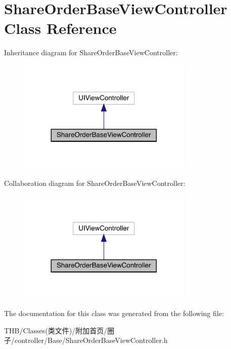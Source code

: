\hypertarget{interface_share_order_base_view_controller}{}\section{Share\+Order\+Base\+View\+Controller Class Reference}
\label{interface_share_order_base_view_controller}


Inheritance diagram for Share\+Order\+Base\+View\+Controller\+:\nopagebreak
\begin{figure}[H]
\begin{center}
\leavevmode
\includegraphics[width=236pt]{interface_share_order_base_view_controller__inherit__graph}
\end{center}
\end{figure}


Collaboration diagram for Share\+Order\+Base\+View\+Controller\+:\nopagebreak
\begin{figure}[H]
\begin{center}
\leavevmode
\includegraphics[width=236pt]{interface_share_order_base_view_controller__coll__graph}
\end{center}
\end{figure}


The documentation for this class was generated from the following file\+:\begin{DoxyCompactItemize}
\item 
T\+H\+B/\+Classes(类文件)/附加首页/圈子/controller/\+Base/Share\+Order\+Base\+View\+Controller.\+h\end{DoxyCompactItemize}
